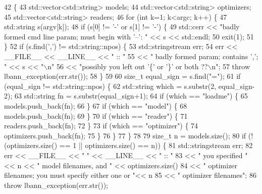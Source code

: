 \begin{DoxyCode}
42                                                       \{
43   std::vector<std::string> models;
44   std::vector<std::string> optimizers;
45   std::vector<std::string> readers;
46   \textcolor{keywordflow}{for} (\textcolor{keywordtype}{int} k=1; k<argc; k++) \{
47     std::string s(argv[k]);
48     \textcolor{keywordflow}{if} (s[0] != \textcolor{charliteral}{'-'} or s[1] != \textcolor{charliteral}{'-'}) \{
49       std::cerr << \textcolor{stringliteral}{"badly formed cmd line param; must begin with '--': "} << s << std::endl;
50       exit(1);
51     \}
52     \textcolor{keywordflow}{if} (s.find(\textcolor{charliteral}{','}) != std::string::npos) \{
53       std::stringstream err;
54       err << \_\_FILE\_\_ << \_\_LINE\_\_ << \textcolor{stringliteral}{" :: "}
55           << \textcolor{stringliteral}{" badly formed param; contains ','; "} << s << \textcolor{stringliteral}{"\(\backslash\)n"}
56           << \textcolor{stringliteral}{"possibly you left out '\{' or '\}' or both ??\(\backslash\)n"};
57       \textcolor{keywordflow}{throw} lbann\_exception(err.str());    
58     \}
59 
60     \textcolor{keywordtype}{size\_t} equal\_sign = s.find(\textcolor{stringliteral}{"="});
61     \textcolor{keywordflow}{if} (equal\_sign != std::string::npos) \{
62       std::string which = s.substr(2, equal\_sign-2);
63       std::string fn = s.substr(equal\_sign+1);
64       \textcolor{keywordflow}{if} (which == \textcolor{stringliteral}{"loadme"}) \{
65         models.push\_back(fn);
66       \}
67       \textcolor{keywordflow}{if} (which == \textcolor{stringliteral}{"model"}) \{
68         models.push\_back(fn);
69       \}
70       \textcolor{keywordflow}{if} (which == \textcolor{stringliteral}{"reader"}) \{
71         readers.push\_back(fn);
72       \}
73       \textcolor{keywordflow}{if} (which == \textcolor{stringliteral}{"optimizer"}) \{
74         optimizers.push\_back(fn);
75       \}
76     \}
77   \}
78 
79   \textcolor{keywordtype}{size\_t} n = models.size();
80   \textcolor{keywordflow}{if} (! (optimizers.size() == 1 || optimizers.size() == n)) \{
81     std::stringstream err;   
82     err << \_\_FILE\_\_ << \textcolor{stringliteral}{" "} << \_\_LINE\_\_ << \textcolor{stringliteral}{" :: "}
83         << \textcolor{stringliteral}{" you specified "} << n << \textcolor{stringliteral}{" model filenames, and "} << optimizers.size()
84         << \textcolor{stringliteral}{" optimizer filenames; you must specify either one or "}<< n
85         << \textcolor{stringliteral}{" optimizer filenames"};
86     \textcolor{keywordflow}{throw} lbann\_exception(err.str());    

\end{DoxyCode}
